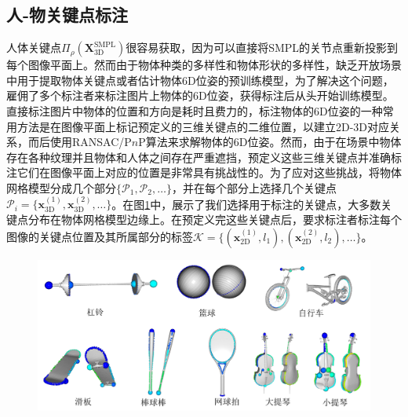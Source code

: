 \subsection{人-物关键点标注}
人体关键点$\Pi_\rho(\mathbf{X}_{\text{3D}}^{\text{SMPL}})$很容易获取，因为可以直接将SMPL的关节点重新投影到每个图像平面上。然而由于物体种类的多样性和物体形状的多样性，缺乏开放场景中用于提取物体关键点或者估计物体6D位姿的预训练模型，为了解决这个问题，雇佣了多个标注者来标注图片上物体的6D位姿，获得标注后从头开始训练模型。直接标注图片中物体的位置和方向是耗时且费力的，标注物体的6D位姿的一种常用方法是在图像平面上标记预定义的三维关键点的二维位置，以建立2D-3D对应关系，而后使用RANSAC/P$n$P算法来求解物体的6D位姿。然而，由于在场景中物体存在各种纹理并且物体和人体之间存在严重遮挡，预定义这些三维关键点并准确标注它们在图像平面上对应的位置是非常具有挑战性的。为了应对这些挑战，将物体网格模型分成几个部分$\{\mathcal{P}_1, \mathcal{P}_2, \dots\}$，并在每个部分上选择几个关键点$\mathcal{P}_i = \{\mathbf{x}_{\text{3D}}^{(1)}, \mathbf{x}_{\text{3D}}^{(2)}, \dots\}$。在图\ref{fig:object-keypoints}中，展示了我们选择用于标注的关键点，大多数关键点分布在物体网格模型边缘上。在预定义完这些关键点后，要求标注者标注每个图像的关键点位置及其所属部分的标签$\mathcal{K} = \{(\mathbf{x}_{\text{2D}}^{(1)}, l_1), (\mathbf{x}_{\text{2D}}^{(2)}, l_2), \dots\}$。
\begin{figure}[!htbp]
	\centering
	\includegraphics{Img/object_keypoint}
	\label{fig:object-keypoints}
\end{figure}

